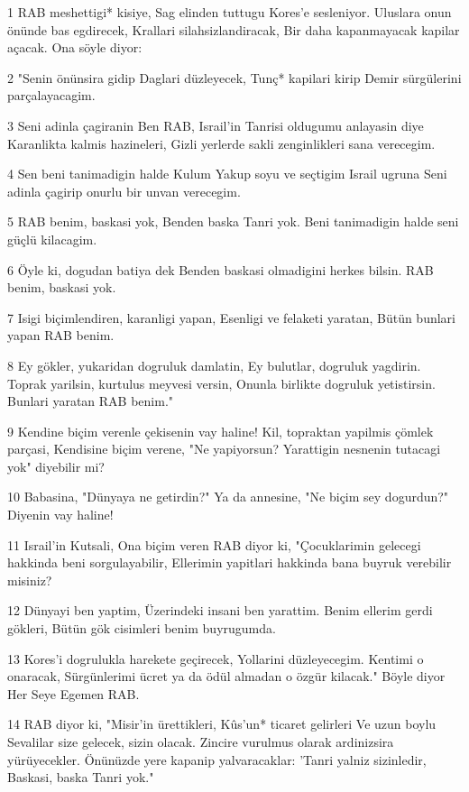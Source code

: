 \par 1 RAB meshettigi* kisiye, Sag elinden tuttugu Kores'e sesleniyor. Uluslara onun önünde bas egdirecek, Krallari silahsizlandiracak, Bir daha kapanmayacak kapilar açacak. Ona söyle diyor:
\par 2 "Senin önünsira gidip Daglari düzleyecek, Tunç* kapilari kirip Demir sürgülerini parçalayacagim.
\par 3 Seni adinla çagiranin Ben RAB, Israil'in Tanrisi oldugumu anlayasin diye Karanlikta kalmis hazineleri, Gizli yerlerde sakli zenginlikleri sana verecegim.
\par 4 Sen beni tanimadigin halde Kulum Yakup soyu ve seçtigim Israil ugruna Seni adinla çagirip onurlu bir unvan verecegim.
\par 5 RAB benim, baskasi yok, Benden baska Tanri yok. Beni tanimadigin halde seni güçlü kilacagim.
\par 6 Öyle ki, dogudan batiya dek Benden baskasi olmadigini herkes bilsin. RAB benim, baskasi yok.
\par 7 Isigi biçimlendiren, karanligi yapan, Esenligi ve felaketi yaratan, Bütün bunlari yapan RAB benim.
\par 8 Ey gökler, yukaridan dogruluk damlatin, Ey bulutlar, dogruluk yagdirin. Toprak yarilsin, kurtulus meyvesi versin, Onunla birlikte dogruluk yetistirsin. Bunlari yaratan RAB benim."
\par 9 Kendine biçim verenle çekisenin vay haline! Kil, topraktan yapilmis çömlek parçasi, Kendisine biçim verene, "Ne yapiyorsun? Yarattigin nesnenin tutacagi yok" diyebilir mi?
\par 10 Babasina, "Dünyaya ne getirdin?" Ya da annesine, "Ne biçim sey dogurdun?" Diyenin vay haline!
\par 11 Israil'in Kutsali, Ona biçim veren RAB diyor ki, "Çocuklarimin gelecegi hakkinda beni sorgulayabilir, Ellerimin yapitlari hakkinda bana buyruk verebilir misiniz?
\par 12 Dünyayi ben yaptim, Üzerindeki insani ben yarattim. Benim ellerim gerdi gökleri, Bütün gök cisimleri benim buyrugumda.
\par 13 Kores'i dogrulukla harekete geçirecek, Yollarini düzleyecegim. Kentimi o onaracak, Sürgünlerimi ücret ya da ödül almadan o özgür kilacak." Böyle diyor Her Seye Egemen RAB.
\par 14 RAB diyor ki, "Misir'in ürettikleri, Kûs'un* ticaret gelirleri Ve uzun boylu Sevalilar size gelecek, sizin olacak. Zincire vurulmus olarak ardinizsira yürüyecekler. Önünüzde yere kapanip yalvaracaklar: 'Tanri yalniz sizinledir, Baskasi, baska Tanri yok."
